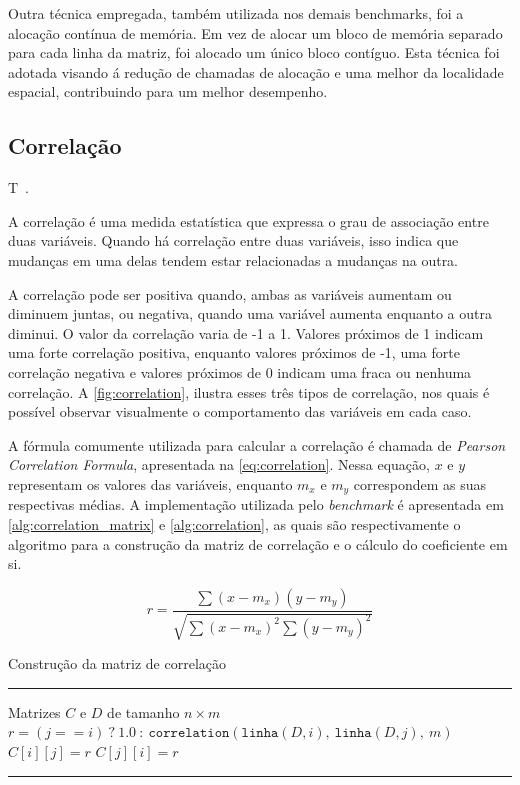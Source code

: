 Outra técnica empregada, também utilizada nos demais benchmarks, foi a alocação contínua de memória. Em vez de alocar um bloco de memória separado para cada linha da matriz, foi alocado um único bloco contíguo. Esta técnica foi adotada visando á redução de chamadas de alocação e uma melhor da localidade espacial, contribuindo para um melhor desempenho.

\subsection{Correlação}\label{subsec:correlation}

T~\cite{morettin2010}.

A correlação é uma medida estatística que expressa o grau de associação entre duas variáveis. Quando há correlação entre duas variáveis, isso indica que mudanças em uma delas tendem estar relacionadas a mudanças na outra.

A correlação pode ser positiva quando, ambas as variáveis aumentam ou diminuem juntas, ou negativa, quando uma variável aumenta enquanto a outra diminui. O valor da correlação varia de -1 a 1. Valores próximos de 1 indicam uma forte correlação positiva, enquanto valores próximos de -1, uma forte correlação negativa e valores próximos de 0 indicam uma fraca ou nenhuma correlação. A \autoref{fig:correlation}, ilustra esses três tipos de correlação, nos quais é possível observar visualmente o comportamento das variáveis em cada caso.

A fórmula comumente utilizada para calcular a correlação é chamada de \textit{Pearson Correlation Formula}, apresentada na \autoref{eq:correlation}. Nessa equação, $x$ e $y$ representam os valores das variáveis, enquanto $m_x$ e $m_y$ correspondem as suas respectivas médias. A implementação utilizada pelo \textit{benchmark} é apresentada em \autoref{alg:correlation_matrix} e \autoref{alg:correlation}, as quais são respectivamente o algoritmo para a construção da matriz de correlação e o cálculo do coeficiente em si.

\begin{equation}
	\label{eq:correlation}
	r = \frac{\sum(x - m_x)(y - m_y)}{\sqrt{\sum(x-m_x)^2 \sum(y - m_y)^2}}
\end{equation}

\begin{algorithm}[htb]
	\caption{Construção da matriz de correlação}
	\label{alg:correlation_matrix}
	\hrule
	\begin{algorithmic}[1]
		\REQUIRE Matrizes $C$ e $D$ de tamanho $n \times m$
		\STATE $r = (j == i)\ ?\ 1.0\ :\ \texttt{correlation}(\texttt{linha}(D, i),\ \texttt{linha}(D, j),\ m)$
		\STATE $C[i][j] = r$
		\STATE $C[j][i] = r$
		\ENDFOR
		\ENDFOR
	\end{algorithmic}
	\hrule
	\fonte{}
\end{algorithm}

